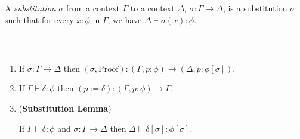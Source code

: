 A \emph{substitution} $\sigma$ from a context $\Gamma$ to a context $\Delta$, $\sigma : \Gamma \rightarrow \Delta$,  is a substitution $\sigma$ such that
for every $x : \phi$ in $\Gamma$, we have $\Delta \vdash \sigma(x) : \phi$.

\begin{code}%
\> \AgdaSymbol{:}  \AgdaSymbol{\{}\AgdaSymbol{\}} \AgdaSymbol{\{}\AgdaSymbol{\}}            \<%
\\
\>     \AgdaSymbol{=}       \AgdaSymbol{\_}        \<%
\end{code}

\begin{lemma}$ $
\begin{enumerate}
\item
If $\sigma : \Gamma \rightarrow \Delta$ then $(\sigma , \mathrm{Proof}) : (\Gamma , p : \phi) \rightarrow (\Delta , p : \phi [ \sigma ])$.
\item
If $\Gamma \vdash \delta : \phi$ then $(p := \delta) : (\Gamma, p : \phi) \rightarrow \Gamma$.
\item
(\textbf{Substitution Lemma})

If $\Gamma \vdash \delta : \phi$ and $\sigma : \Gamma \rightarrow \Delta$ then $\Delta \vdash \delta [ \sigma ] : \phi [ \sigma ]$.
\end{enumerate}
\end{lemma}

\begin{code}%
\> \AgdaSymbol{:}  \AgdaSymbol{\{}\AgdaSymbol{\}} \AgdaSymbol{\{}\AgdaSymbol{\}} \AgdaSymbol{\{}\AgdaSymbol{\}} \<[27]%
\>[27]\<%
\\
\>[0]\<[2]%
\>[2]\AgdaSymbol{\{} \AgdaSymbol{:}  \AgdaSymbol{\}} \AgdaSymbol{\{} \AgdaSymbol{:}  \AgdaSymbol{\}} \AgdaSymbol{\{} \AgdaSymbol{:}  \AgdaSymbol{\}}  \<[48]%
\>[48]\<%
\\
\>[0]\<[2]%
\>[2]          \AgdaSymbol{(}  \AgdaSymbol{)}  \AgdaSymbol{(}     \AgdaSymbol{)}\<%
\end{code}

